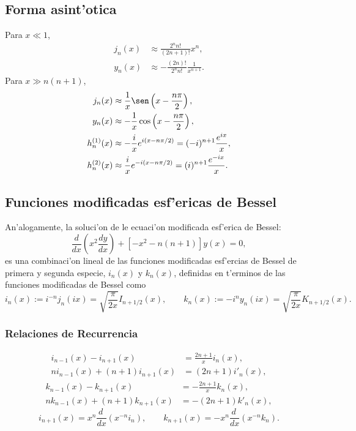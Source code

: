 \subsection{Forma asint'otica}
Para $x\ll 1$,
\begin{align}
j_n(x) &\approx \frac{2^nn!}{(2n+1)!}x^n, \\
y_n(x) &\approx -\frac{(2n)!}{2^nn!}\frac{1}{x^{n+1}}.
\end{align}
Para $x\gg n(n+1)$,
\begin{align}
j_n(x) &\approx \frac{1}{x}\sen\left(x-\frac{n\pi}{2}\right), \\
y_n(x) &\approx -\frac{1}{x}\cos\left(x-\frac{n\pi}{2}\right), \\
h^{(1)}_n(x) &\approx -\frac{i}{x}e^{i(x-{n\pi}/{2})}=(-i)^{n+1}\frac{e^{ix}}{x}, \\
h^{(2)}_n(x) &\approx \frac{i}{x}e^{-i(x-{n\pi}/{2})}=(i)^{n+1}\frac{e^{-ix}}{x}.
\end{align}

\subsection{Funciones modificadas esf'ericas de Bessel}
An'alogamente, la soluci'on de le ecuaci'on modificada esf'erica de Bessel:
\begin{equation}
\frac{d}{dx}\left(x^2\frac{dy}{dx}\right)+[-x^2-n(n+1)]y(x)=0,
\end{equation}
es una combinaci'on lineal de las funciones modificadas esf'ercias de Bessel de primera y segunda especie, $i_n(x)$ y $k_n(x)$, definidas en t'erminos de las funciones modificadas de Bessel como 
\begin{equation}
i_n(x):=i^{-n}j_n(ix)=\sqrt{\frac{\pi}{2x}}I_{n+1/2}(x), \qquad 
k_n(x):=-i^{n}y_n(ix)=\sqrt{\frac{\pi}{2x}}K_{n+1/2}(x).
\end{equation}

\subsubsection{Relaciones de Recurrencia}
\begin{align}
i_{n-1}(x)-i_{n+1}(x) &= \frac{2n+1}{x}i_n(x),  \\
ni_{n-1}(x)+(n+1)i_{n+1}(x) &= (2n+1)i'_n(x),
\end{align}
\begin{align}
k_{n-1}(x)-k_{n+1}(x) &= -\frac{2n+1}{x}k_n(x),\\
nk_{n-1}(x)+(n+1)k_{n+1}(x) &= -(2n+1)k'_n(x),
\end{align}
\begin{equation}
i_{n+1}(x)=x^n\frac{d\ }{dx}(x^{-n}i_n), \qquad k_{n+1}(x)=-x^n\frac{d\ }{dx}(x^{-n}k_n).
\end{equation}


